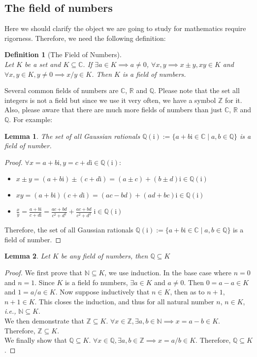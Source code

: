 \documentclass[a4paper]{book}
\newtheorem*{proof}{\textit{Proof.}}
\newtheorem{definition}{Definition}[section]
\newtheorem{lemma}{Lemma}[section]
\newcommand\im{\mathrm{i}}
\begin{document}
				\subsection{The field of numbers}
					Here we should clarify the object we are going to study for mathematics require rigorness. Therefore, we need the following definition:
					\begin{definition}[The Field of Numbers]
						~\\Let $K$ be a set and $K\subseteq\mathbb{C}$. If $\exists a\in K\implies a\neq0$, $\forall x,y\implies x\pm y,xy\in K$ and $\forall x,y\in K, y\neq 0\implies x/y\in K$. Then $K$ is a field of numbers.
					\end{definition}
					Several common fields of numbers are $\mathbb{C}$, $\mathbb{R}$ and $\mathbb{Q}$. Please note that the set all integers is not a field but since we use it very often, we have a symbol $\mathbb{Z}$ for it.\\
					Also, please aware that there are much more fields of numbers than just $\mathbb{C}$, $\mathbb{R}$ and $\mathbb{Q}$. For example:
					\begin{lemma}
						The set of all Gaussian rationals $\mathbb{Q}(\im):=\{a+b\im\in\mathbb{C}\mid a,b\in \mathbb{Q}\}$ is a field of number.
					\end{lemma}
					\begin{proof}
						$\forall x=a+b\im,y=c+d\im\in\mathbb{Q}(\im):$
						\begin{itemize}
							\item $x\pm y=(a+b\im)\pm(c+d\im)=(a\pm c)+(b\pm d)\im\in \mathbb{Q}(\im)$
							\item $xy=(a+b\im)(c+d\im)=(ac-bd)+(ad+bc)\im\in \mathbb{Q}(\im)$
							\item $\displaystyle\frac{x}{y}=\frac{a+b\im}{c+d\im}=\frac{ac+bd}{c^2+d^2}+\frac{ac+bd}{c^2+d^2}\;\im\in \mathbb{Q}(\im)$
						\end{itemize}
						Therefore, the set of all Gaussian rationals $\mathbb{Q}(\im):=\{a+b\im\in\mathbb{C}\mid a,b\in \mathbb{Q}\}$ is a field of number.
					\end{proof}
					\begin{lemma}
						Let $K$ be any field of numbers, then $\mathbb{Q}\subseteq K$
					\end{lemma}
					\begin{proof}
						We first prove that $\mathbb{N}\subseteq K$, we use induction. In the base case where $n=0$ and $n=1$. Since $K$ is a field fo numbers, $\exists a\in K$ and $a\neq0$. Then $0=a-a\in K$ and $1=a/a\in K$. Now suppose inductively that $n\in K$, then as to $n+1$, $n+1\in K$. This closes the induction, and thus for all natural number $n$, $n\in K$, \textit{i.e.,} $\mathbb{N}\subseteq K$.\\
						We then demonstrate that $\mathbb{Z}\subseteq K$. $\forall x\in\mathbb{Z}, \exists a,b\in\mathbb{N}\implies x=a-b\in K$. Therefore, $\mathbb{Z}\subseteq K$.\\
						We finally show that $\mathbb{Q}\subseteq K$. $\forall x\in\mathbb{Q}, \exists a,b\in\mathbb{Z}\implies x=a/b\in K$. Therefore, $\mathbb{Q}\subseteq K$.
					\end{proof}
\end{document}
